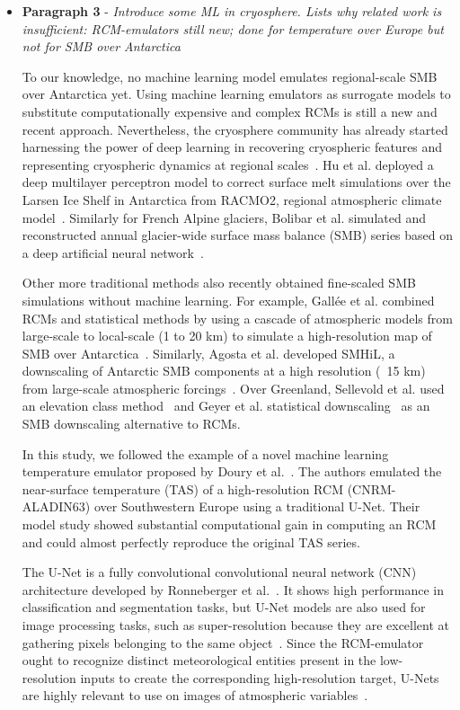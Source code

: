 \documentclass[a4paper,11pt,oneside]{report}
\begin{document}
\begin{itemize}
    \item \textbf{Paragraph 3} - \textit{Introduce some ML in cryosphere. Lists why related work is insufficient: RCM-emulators still new; done for temperature over Europe but not for SMB over Antarctica}
    
    To our knowledge, no machine learning model emulates regional-scale SMB over Antarctica yet. Using machine learning emulators as surrogate models to substitute computationally expensive and complex RCMs is still a new and recent approach. Nevertheless, the cryosphere community has already started harnessing the power of deep learning in recovering cryospheric features and representing cryospheric dynamics at regional scales~\cite{Liu2021}. Hu et al. deployed a deep multilayer perceptron model to correct surface melt simulations over the Larsen Ice Shelf in Antarctica from RACMO2, regional atmospheric climate model~\cite{Hu2021}. Similarly for French Alpine glaciers, Bolibar et al. simulated and reconstructed annual glacier-wide surface mass balance (SMB) series based on a deep artificial neural network~\cite{Bolibar2020}. 
    
    Other more traditional methods also recently obtained fine-scaled SMB simulations without machine learning. For example, Gallée et al. combined RCMs and statistical methods by using a cascade of atmospheric models from large-scale to local-scale (1 to 20 \si{km}) to simulate a high-resolution map of SMB over Antarctica~\cite{Gallée2011}. Similarly, Agosta et al. developed SMHiL, a downscaling of Antarctic SMB components at a high resolution (~15 km) from large-scale atmospheric forcings~\cite{Agosta2012}. Over Greenland, Sellevold et al. used an elevation class method~\cite{Sellevold2019} and Geyer et al. statistical downscaling~\cite{Geyer2013} as an SMB downscaling alternative to RCMs.
    
    In this study, we followed the example of a novel machine learning temperature emulator proposed by Doury et al.~\cite{Doury}. The authors emulated the near-surface temperature (TAS) of a high-resolution RCM (CNRM-ALADIN63) over Southwestern Europe using a traditional U-Net. Their model study showed substantial computational gain in computing an RCM and could almost perfectly reproduce the original TAS series. 
        
        
        
        The U-Net is a fully convolutional convolutional neural network (CNN) architecture developed by Ronneberger et al.~\cite{Ronneberger2015}. It shows high performance in classification and segmentation tasks, but U-Net models are also used for image processing tasks, such as super-resolution because they are excellent at gathering pixels belonging to the same object~\cite{Doury, howard2018fastai}. Since the RCM-emulator ought to recognize distinct meteorological entities present in the low-resolution inputs to create the corresponding high-resolution target, U-Nets are highly relevant to use on images of atmospheric variables~\cite{Doury}. 
        

\end{itemize}
\end{document}
